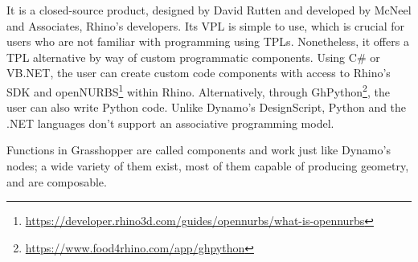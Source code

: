 It is a closed-source product, designed by David Rutten and developed by McNeel
and Associates, Rhino's developers.  Its \ac{VPL} is simple to use, which is
crucial for users who are not familiar with programming using \acp{TPL}.
Nonetheless, it offers a \ac{TPL} alternative by way of custom programmatic
components.  Using C\# or VB.NET, the user can create custom code components
with access to Rhino's \ac{SDK} and
openNURBS\footnote{\url{https://developer.rhino3d.com/guides/opennurbs/what-is-opennurbs}}
within Rhino.  Alternatively, through
GhPython\footnote{\url{https://www.food4rhino.com/app/ghpython}}, the user can
also write Python code.  Unlike Dynamo's DesignScript, Python and the .NET
languages don't support an associative programming model.

Functions in Grasshopper are called components and work just like Dynamo's
nodes; a wide variety of them exist, most of them capable of producing geometry,
and are composable.
